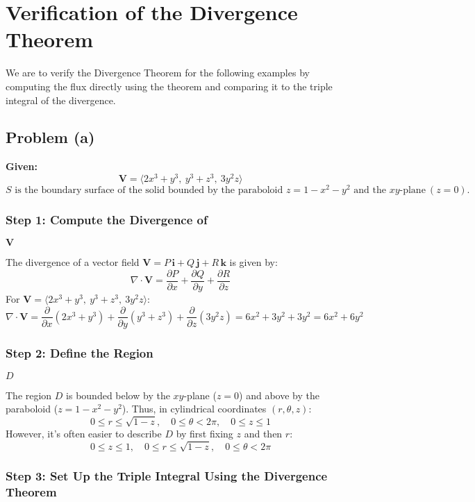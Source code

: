 \documentclass[11pt]{article}
\begin{document}
\newpage

\section{Verification of the Divergence Theorem}

We are to verify the Divergence Theorem for the following examples by computing the flux directly using the theorem and comparing it to the triple integral of the divergence.

\newpage

\subsection{Problem (a)}

\textbf{Given:}
\[
\mathbf{V} = \langle 2x^3 + y^3, \ y^3 + z^3, \ 3y^2 z \rangle
\]
\[
S \text{ is the boundary surface of the solid bounded by the paraboloid } z = 1 - x^2 - y^2 \text{ and the } xy\text{-plane} \ (z = 0).
\]

\subsubsection*{Step 1: Compute the Divergence of } $\mathbf{V}$

The divergence of a vector field \( \mathbf{V} = P\,\mathbf{i} + Q\,\mathbf{j} + R\,\mathbf{k} \) is given by:
\[
\nabla \cdot \mathbf{V} = \frac{\partial P}{\partial x} + \frac{\partial Q}{\partial y} + \frac{\partial R}{\partial z}
\]
For \( \mathbf{V} = \langle 2x^3 + y^3, \ y^3 + z^3, \ 3y^2 z \rangle \):
\[
\nabla \cdot \mathbf{V} = \frac{\partial}{\partial x}(2x^3 + y^3) + \frac{\partial}{\partial y}(y^3 + z^3) + \frac{\partial}{\partial z}(3y^2 z) = 6x^2 + 3y^2 + 3y^2 = 6x^2 + 6y^2
\]

\subsubsection*{Step 2: Define the Region } $D$

The region \( D \) is bounded below by the \( xy \)-plane (\( z = 0 \)) and above by the paraboloid (\( z = 1 - x^2 - y^2 \)). Thus, in cylindrical coordinates \((r, \theta, z)\):
\[
0 \leq r \leq \sqrt{1 - z}, \quad 0 \leq \theta < 2\pi, \quad 0 \leq z \leq 1
\]
However, it's often easier to describe \( D \) by first fixing \( z \) and then \( r \):
\[
0 \leq z \leq 1, \quad 0 \leq r \leq \sqrt{1 - z}, \quad 0 \leq \theta < 2\pi
\]

\subsubsection*{Step 3: Set Up the Triple Integral Using the Divergence Theorem}
\end{document}
